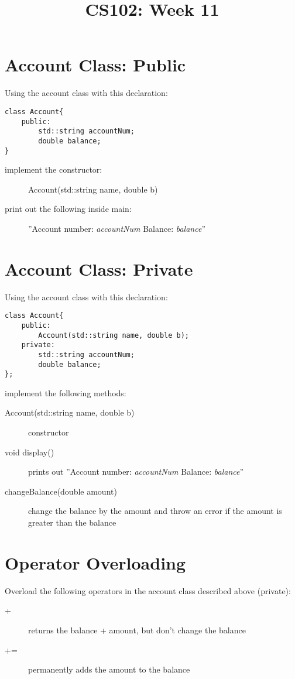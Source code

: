 \documentclass{article}
\begin{document}
\title{CS102: Week 11}

\maketitle
\section*{Account Class: Public}
Using the account class with this declaration: 
\begin{lstlisting}
class Account{
    public:
        std::string accountNum;
        double balance;
}
\end{lstlisting}
\begin{description}
    \item[implement the constructor:]Account(std::string name, double b) 
    \item[print out the following inside main:] ''Account number: \textit{accountNum} Balance: \textit{balance}''
\end{description}

\section*{Account Class: Private}
Using the account class with this declaration:
\begin{lstlisting}
class Account{
    public:
        Account(std::string name, double b);
    private:
        std::string accountNum;
        double balance;
};
\end{lstlisting}
implement the following methods:
\begin{description}
    \item [Account(std::string name, double b)]
        constructor
    \item [void display()]
     prints out ''Account number: \textit{accountNum}
     Balance: \textit{balance}''
    \item[changeBalance(double amount)]
    change the balance by the amount and throw an error if the amount
    is greater than the balance
\end{description}

\section*{Operator Overloading}
Overload the following operators in the account class described above (private):
\begin{description}
    \item[+] returns the balance + amount, but don't change the balance
    \item[+=] permanently adds the amount to the balance
\end{description}
\end{document}
